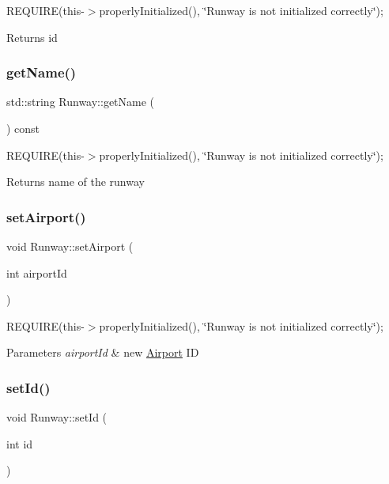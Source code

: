 R\+E\+Q\+U\+I\+RE(this-\/$>$properly\+Initialized(), \char`\"{}\+Runway is not initialized correctly\char`\"{}); \begin{DoxyReturn}{Returns}
id 
\end{DoxyReturn}
\mbox{\label{class_runway_a525e4c94639bde05c335492d5229f882}} 
\subsubsection{\texorpdfstring{get\+Name()}{getName()}}
{\footnotesize\ttfamily std\+::string Runway\+::get\+Name (\begin{DoxyParamCaption}{ }\end{DoxyParamCaption}) const}

R\+E\+Q\+U\+I\+RE(this-\/$>$properly\+Initialized(), \char`\"{}\+Runway is not initialized correctly\char`\"{}); \begin{DoxyReturn}{Returns}
name of the runway 
\end{DoxyReturn}
\mbox{\label{class_runway_a6614626321a1f4c33f24800cbe78d330}} 
\subsubsection{\texorpdfstring{set\+Airport()}{setAirport()}}
{\footnotesize\ttfamily void Runway\+::set\+Airport (\begin{DoxyParamCaption}\item[{int}]{airport\+Id }\end{DoxyParamCaption})}

R\+E\+Q\+U\+I\+RE(this-\/$>$properly\+Initialized(), \char`\"{}\+Runway is not initialized correctly\char`\"{}); 
\begin{DoxyParams}{Parameters}
{\em airport\+Id} & new \mbox{\hyperlink{class_airport}{Airport}} ID \\
\hline
\end{DoxyParams}
\mbox{\label{class_runway_af587fc8f841c10a99427cf7a0f442fce}} 
\subsubsection{\texorpdfstring{set\+Id()}{setId()}}
{\footnotesize\ttfamily void Runway\+::set\+Id (\begin{DoxyParamCaption}\item[{int}]{id }\end{DoxyParamCaption})}

